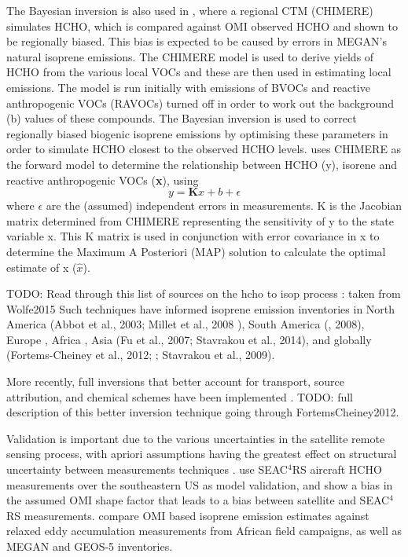    The Bayesian inversion is also used in \citet{Curci2010}, where a regional CTM (CHIMERE) simulates HCHO, which is compared against OMI observed HCHO and shown to be regionally biased.
   This bias is expected to be caused by errors in MEGAN's natural isoprene emissions.
   The CHIMERE model is used to derive yields of HCHO from the various local VOCs and these are then used in estimating local emissions.
   The model is run initially with emissions of BVOCs and reactive anthropogenic VOCs (RAVOCs) turned off in order to work out the background (b) values of these compounds.
   The Bayesian inversion is used to correct regionally biased biogenic isoprene emissions by optimising these parameters in order to simulate HCHO closest to the observed HCHO levels.
   \cite{Curci2010} uses CHIMERE as the forward model to determine the relationship between HCHO (y), isorene and reactive anthropogenic VOCs (\textbf{x}), using 
   \begin{equation}
       y=\mathbf{K}x + b + \epsilon
   \end{equation}
   where $\epsilon$ are the (assumed) independent errors in measurements.
   K is the Jacobian matrix determined from CHIMERE representing the sensitivity of y to the state variable x.
   This K matrix is used in conjunction with error covariance in x to determine the Maximum A Posteriori (MAP) solution to calculate the optimal estimate of x ($\hat{x}$).
   
   TODO: Read through this list of sources on the hcho to isop process : taken from Wolfe2015
   Such techniques have informed isoprene emission inventories in North America (Abbot et al., 2003; Millet et al., 2008 \citep{Palmer2003,Millet2006,Palmer2006}), South America (\citep{Barkley2013}, 2008), Europe \citep{Curci2010,Dufour2009}, Africa \citep{Marais2012}, Asia (Fu et al., 2007; Stavrakou et al., 2014), and globally (Fortems-Cheiney et al., 2012; \citep{Shim2005}; Stavrakou et al., 2009).
   
   More recently, full inversions that better account for transport, source attribution, and chemical schemes have been implemented \citep{FortemsCheiney2012}.
   TODO: full description of this better inversion technique going through FortemsCheiney2012.
   
   Validation is important due to the various uncertainties in the satellite remote sensing process, with apriori assumptions having the greatest effect on structural uncertainty between measurements techniques \citet{Lorente2017}.
   \cite{Zhu2016} use SEAC$^4$RS aircraft HCHO measurements over the southeastern US as model validation, and show a bias in the assumed OMI shape factor that leads to a bias between satellite and SEAC$^4$RS measurements.
   \cite{Marais2014} compare OMI based isoprene emission estimates against relaxed eddy accumulation measurements from African field campaigns, as well as MEGAN and GEOS-5 inventories.
   
